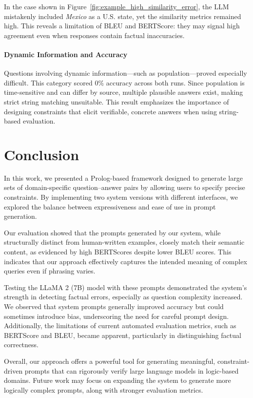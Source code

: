 \documentclass{article}
\begin{document}
In the case shown in Figure~\ref{fig:example_high_similarity_error}, the LLM mistakenly included \emph{Mexico} as a U.S. state, yet the similarity metrics remained high. 
This reveals a limitation of BLEU and BERTScore: they may signal high agreement even when responses contain 
factual inaccuracies.

\paragraph{Dynamic Information and Accuracy}

Questions involving dynamic information—such as population—proved especially difficult. 
This category scored 0\% accuracy across both runs. Since population is time-sensitive and can differ 
by source, multiple plausible answers exist, making strict string matching unsuitable. This result 
emphasizes the importance of designing constraints that elicit verifiable, concrete answers when 
using string-based evaluation.

\section{Conclusion}

In this work, we presented a Prolog-based framework designed to generate large sets of domain-specific question–answer 
pairs by allowing users to specify precise constraints. By implementing two system versions with different interfaces, 
we explored the balance between expressiveness and ease of use in prompt generation.

Our evaluation showed that the prompts generated by our system, while structurally distinct from human-written examples, 
closely match their semantic content, as evidenced by high BERTScores despite lower BLEU scores. This indicates that 
our approach effectively captures the intended meaning of complex queries even if phrasing varies.

Testing the LLaMA 2 (7B) model with these prompts demonstrated the system’s strength in detecting factual errors, 
especially as question complexity increased. We observed that system prompts generally improved accuracy but could 
sometimes introduce bias, underscoring the need for careful prompt design. Additionally, the limitations of current 
automated evaluation metrics, such as BERTScore and BLEU, became apparent, particularly in distinguishing factual 
correctness.

Overall, our approach offers a powerful tool for generating meaningful, constraint-driven prompts that can rigorously 
verify large language models in logic-based domains. Future work may focus on expanding the system to generate more 
logically complex prompts, along with stronger evaluation metrics.

\newpage
{
\small



}
\end{document}
